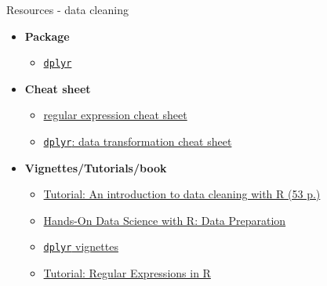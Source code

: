 \documentclass[8pt,ignorenonframetext,]{beamer}
\providecommand{\tightlist}{%
  \setlength{\itemsep}{0pt}\setlength{\parskip}{0pt}}
\begin{document}
\begin{frame}[fragile]{Resources - data cleaning}

\begin{itemize}
\tightlist
\item
  \textbf{Package}

  \begin{itemize}
  \tightlist
  \item
    \href{https://cran.r-project.org/web/packages/dplyr/index.html}{\texttt{dplyr}}
  \end{itemize}
\item
  \textbf{Cheat sheet}

  \begin{itemize}
  \tightlist
  \item
    \href{https://www.rstudio.com/wp-content/uploads/2016/09/RegExCheatsheet.pdf}{regular
    expression cheat sheet}
  \item
    \href{https://github.com/rstudio/cheatsheets/raw/master/data-transformation.pdf}{\texttt{dplyr}:
    data transformation cheat sheet}
  \end{itemize}
\item
  \textbf{Vignettes/Tutorials/book}

  \begin{itemize}
  \tightlist
  \item
    \href{https://cran.r-project.org/doc/contrib/de_Jonge+van_der_Loo-Introduction_to_data_cleaning_with_R.pdf}{Tutorial:
    An introduction to data cleaning with R (53 p.)}
  \item
    \href{https://onepager.togaware.com/DataO.pdf}{Hands-On Data Science
    with R: Data Preparation}
  \item
    \href{https://cran.r-project.org/web/packages/dplyr/index.html}{\texttt{dplyr}
    vignettes}
  \item
    \href{https://rstudio-pubs-static.s3.amazonaws.com/74603_76cd14d5983f47408fdf0b323550b846.html}{Tutorial:
    Regular Expressions in R}
  \end{itemize}
\end{itemize}

\end{frame}
\end{document}
